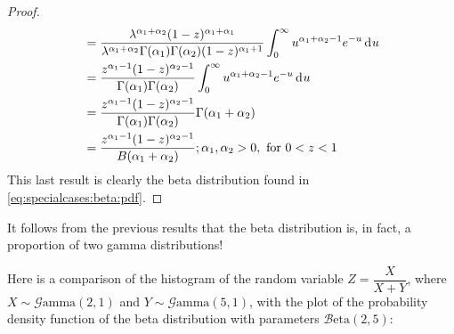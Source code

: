 \documentclass[12pt]{article}
\newcommand{\B}{\mathcal{B}}
\newcommand{\G}{\mathcal{G}}
\begin{document}
\begin{proof}
\begin{equation}
\begin{split}
					&=	\frac{\lambda^{\alpha_1+\alpha_2} (1-z)^{\alpha_1 + \alpha_1}}{\lambda^{\alpha_1+\alpha_2} \Gamma (\alpha _1) \Gamma (\alpha _2) (1-z)^{\alpha_1 +1}} \int_{0}^{\infty} u^{\alpha_1 + \alpha_2 -1} e^{-u}\mathop{}\!\mathrm{d^{}}u\\
					&=	\frac{z^{\alpha_1 -1} (1-z)^{\alpha_2 -1}}{\Gamma (\alpha _1) \Gamma (\alpha _2)} \int_{0}^{\infty} u^{\alpha_1 + \alpha_2 -1} e^{-u}\mathop{}\!\mathrm{d^{}}u\\
					&=	\frac{z^{\alpha_1 -1} (1-z)^{\alpha_2 -1}}{\Gamma (\alpha _1) \Gamma (\alpha _2)} \Gamma(\alpha_1 + \alpha_2)\\
					&=	\frac{z^{\alpha_1 -1} (1-z)^{\alpha_2 -1}}{B(\alpha_1 +\alpha_2)} ;\alpha _1,\alpha _2>0, \text{ for } 0<z<1\\
		\end{split}
	\end{equation}
	This last result is clearly the beta distribution found in \autoref{eq:specialcases:beta:pdf}.
\end{proof}

It follows from the previous results that the beta distribution is, in fact, a proportion of two gamma distributions!

Here is a comparison of the histogram of the random variable $Z=\dfrac{X}{X+Y}$, where $X\sim\G\text{amma}(2, 1)$ and
$Y\sim\G\text{amma}(5, 1)$, with the plot of the probability density function of the beta distribution with parameters
$\B\text{eta}(2,5)$:


\pagebreak
\end{document}
